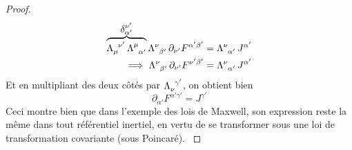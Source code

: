 \begin{proof}
{    \begin{align*}
        \overbrace{\Lambda\indices{_\mu^{\nu '}}\, \Lambda\indices{^{\mu}_{\alpha'}}}^{\displaystyle\delta^{\nu '}_{\alpha' }}\Lambda\indices{^{\nu}_{\beta '}}\, \partial_{\nu '} F^{\alpha ' \beta '} & =  \Lambda\indices{^{\nu }_{\alpha'}}\,J^{\alpha '} \\
        \implies \Lambda\indices{^{\nu}_{\beta '}}\, \partial_{\nu '} F^{\nu ' \beta '}  &=  \Lambda\indices{^{\nu }_{\alpha'}}\, J^{\alpha '}
    \end{align*}
    Et en multipliant des deux côtés par $\displaystyle\Lambda\indices{_\nu^{\gamma'}}$, on obtient bien
    \begin{equation}
        \partial_{\alpha '}F^{\alpha ' \gamma '} = J^{\gamma '}
    \end{equation}
    Ceci montre bien que dans l'exemple des lois de Maxwell, son expression reste la même dans tout référentiel inertiel, en vertu de se transformer sous une loi de transformation covariante (sous Poincaré).
    }
\end{proof}

